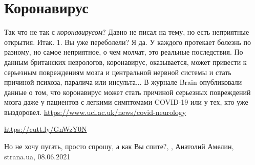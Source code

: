  
 
 
 
 
\chapter{Коронавирус}

Так что не так с \emph{коронавирусом}?  Давно не писал на тему, но есть
неприятные открытия. Итак. 1. Вы уже переболели? Я да.  У каждого протекает
болезнь по разному, но самое неприятное, о чем молчат, это реальные
последствия.  По данным британских неврологов, коронавирус, оказывается, может
привести к серьезным повреждениям мозга и центральной нервной системы и стать
причиной психоза, паралича или инсульта...  В журнале Brain опубликовали данные
о том, что коронавирус может стать причиной серьезных повреждений мозга даже у
пациентов с легкими симптомами COVID-19 или у тех, кто уже выздоровел.
\url{https://www.ucl.ac.uk/news/covid-neurology}\par
\url{https://cutt.ly/GnWzY0N}\par Но не хочу пугать, просто спрошу, а как Вы
спите?,
, Анатолий Амелин, strana.ua, 08.06.2021

